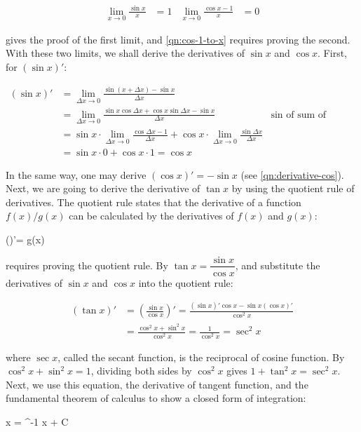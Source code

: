 \documentclass[b5paper]{article}
\begin{document}
\begin{align}
\lim_{x \to 0} \frac{\sin x}{x} &= 1  & \lim_{x \to 0} \frac{\cos x - 1}{x} &= 0
\end{align}

 gives the proof of the first limit, and \cref{qn:cos-1-to-x} requires proving the second. With these two limits, we shall derive the derivatives of $\sin x$ and $\cos x$. First, for $(\sin x)'$:

\begin{align*}
(\sin x)' &= \lim_{\Delta x \to 0} \frac{\sin(x + \Delta x) - \sin x}{\Delta x} \\
  &= \lim_{\Delta x \to 0} \frac{\sin x \cos \Delta x + \cos x\sin \Delta x - \sin x}{\Delta x} & \text{sin of sum of angles} \\
  &= \sin x \cdot \lim_{\Delta x \to 0} \frac{\cos \Delta x - 1}{\Delta x} + \cos x \cdot \lim_{\Delta x \to 0} \frac{\sin \Delta x}{\Delta x} \\
  &= \sin x \cdot 0 + \cos x \cdot 1 = \cos x
\end{align*}

In the same way, one may derive $(\cos x)' = - \sin x$ (see \cref{qn:derivative-cos}). Next, we are going to derive the derivative of $\tan x$ by using the quotient rule of derivatives. The quotient rule states that the derivative of a function $f(x)/g(x)$ can be calculated by the derivatives of $f(x)$ and $g(x)$:

\be
()'= \qquad {}g(x) 
\ee

 requires proving the quotient rule. By  $\tan x = \dfrac{\sin x}{\cos x}$, and substitute the derivatives of $\sin x$ and $\cos x$ into the quotient rule:

\begin{align*}
(\tan x)' & = (\frac{\sin x}{\cos x})' = \frac{(\sin x)'\cos x - \sin x (\cos x)'}{\cos^2 x} \\
 &= \frac{\cos^2 x + \sin^2 x}{\cos^2 x} = \frac{1}{\cos^2 x} = \sec^2 x
\end{align*}

where $\sec x$, called the secant function, is the reciprocal of cosine function. By $\cos^2 x + \sin^2 x = 1$, dividing both sides by $\cos^2 x$ gives $1 + \tan^2 x = \sec^2 x$. Next, we use this equation, the derivative of tangent function, and the fundamental theorem of calculus to show a closed form of integration:

\be
\int {}  x = \tan^{-1} x + C
\ee
\end{document}

